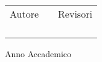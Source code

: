 \begin{titlepage}
\begin{center}
	\Logo

	\vspace{2cm}
	\LARGE{\Department\\}

	\vspace{1cm}
	\Large{\Faculty}

	\vspace{2cm}
	\Large\textsc{\What\\}
	\vspace{.5cm}
	{\Huge\textsc{\Subject}\\}
	{\Large\emph{\Subtitle}}

	\vfill
	\begin{tabularx}{\textwidth}{ c X c }
		{\LARGE Autore}	&	& {\LARGE Revisori} \\
		\cmidrule(lr){1-1}\cmidrule(lr){3-3}
		\Author	&	& \firstReviserName \\
				&	& \secondReviserName \\
				&	& \thirdReviserName \\
				&	& \fourthReviserName \\
	\end{tabularx}

	\vfill
	\Large{Anno Accademico \academicYear}
\end{center}
\end{titlepage}
